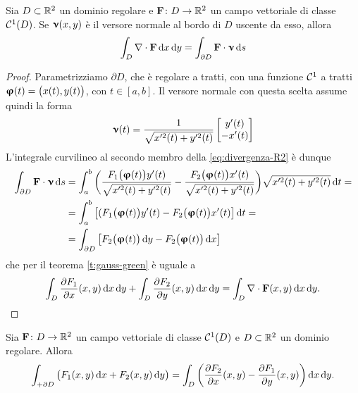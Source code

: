 \begin{teorema} \label{t:divergenza-R2}
	Sia $D\subset\mathbb{R}^2$ un dominio regolare e $\mathbf{F}\colon D\to\mathbb{R}^2$ un campo vettoriale di classe $\mathcal{C}^{{1}}(D)$.
	Se $\bm{\upnu}(x,y)$ è il versore normale al bordo di $D$ uscente da esso, allora
	\begin{equation}
		\int_D\nabla\cdot\mathbf{F}\,\textup{d} x\,\textup{d} y=\int_{\partial D}{\mathbf{F}}\cdot{\bm{\upnu}}\,\textup{d} s
		\label{eq:divergenza-R2}
	\end{equation}
\end{teorema}
\begin{proof}
	Parametrizziamo $\partial D$, che è regolare a tratti, con una funzione $\mathcal{C}^{{1}}$ a tratti $\bm{\upvarphi}(t)=\big(x(t),y(t)\big)$, con $t\in[a,b]$.
	Il versore normale con questa scelta assume quindi la forma
	\begin{equation*}
		\bm{\upnu}(t)=\frac1{\sqrt{x'^2(t)+y'^2(t)}}
		\begin{bmatrix}
			y'(t)\\-x'(t)
		\end{bmatrix}
	\end{equation*}
	L'integrale curvilineo al secondo membro della \eqref{eq:divergenza-R2} è dunque
	\begin{equation}
		\begin{split}
			\int_{\partial D}{\mathbf{F}}\cdot{\bm{\upnu}}\,\textup{d} s&=\int_a^b\bigg(\frac{F_1\big(\bm{\upvarphi}(t)\big)y'(t)}{\sqrt{x'^2(t)+y'^2(t)}}-\frac{F_2\big(\bm{\upvarphi}(t)\big)x'(t)}{\sqrt{x'^2(t)+y'^2(t)}}\bigg)\sqrt{x'^2(t)+y'^2(t)}\,\textup{d} t=\\
			&=\int_a^b\big[(F_1\big(\bm{\upvarphi}(t)\big)y'(t)-F_2\big(\bm{\upvarphi}(t)\big)x'(t)\big]\,\textup{d} t=\\
			&=\int_{\partial D}\big[F_2\big(\bm{\upvarphi}(t)\big)\,\textup{d} y-F_2\big(\bm{\upvarphi}(t)\big)\,\textup{d} x\big]
		\end{split}
	\end{equation}
	che per il teorema \ref{t:gauss-green} è uguale a
	\begin{equation}
		\int_D\frac{\partial {F_1}}{\partial {x}}(x,y)\,\textup{d} x\,\textup{d} y+\int_D\frac{\partial {F_2}}{\partial {y}}(x,y)\,\textup{d} x\,\textup{d} y=\int_D\nabla\cdot\mathbf{F}(x,y)\,\textup{d} x\,\textup{d} y.\qedhere
	\end{equation}
\end{proof}
\begin{teorema} \label{t:rotore-R2}
	Sia $\mathbf{F}\colon D\to\mathbb{R}^2$ un campo vettoriale di classe $\mathcal{C}^{{1}}(D)$ e $D\subset\mathbb{R}^2$ un dominio regolare.
	Allora
	\begin{equation}
		\int_{+\partial D}\big(F_1(x,y)\,\textup{d} x+F_2(x,y)\,\textup{d} y\big)=\int_D\bigg(\frac{\partial {F_2}}{\partial {x}}(x,y)-\frac{\partial {F_1}}{\partial {y}}(x,y)\bigg)\,\textup{d} x\,\textup{d} y.
		\label{eq:rotore-R2}
	\end{equation}
\end{teorema}
